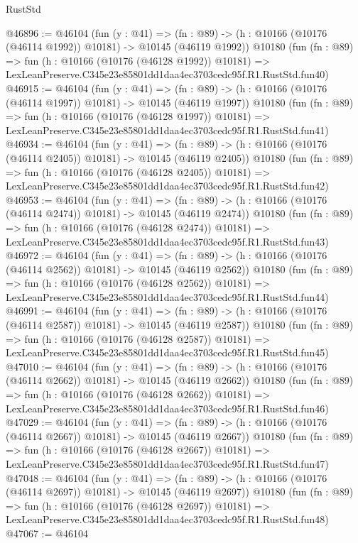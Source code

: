 \begin{lexlean}{RustStd}
\begin{coremodule}
@46896 := @46104
    (fun (y : @41) =>
    (fn : @89) -> (h : @10166 (@10176 (@46114 @1992)) @10181) -> @10145 (@46119 @1992))
    @10180
    (fun (fn : @89) =>
    fun (h : @10166 (@10176 (@46128 @1992)) @10181) =>
    LexLeanPreserve.C345e23e85801dd1daa4ec3703cedc95f.R1.RustStd.fun40)
@46915 := @46104
    (fun (y : @41) =>
    (fn : @89) -> (h : @10166 (@10176 (@46114 @1997)) @10181) -> @10145 (@46119 @1997))
    @10180
    (fun (fn : @89) =>
    fun (h : @10166 (@10176 (@46128 @1997)) @10181) =>
    LexLeanPreserve.C345e23e85801dd1daa4ec3703cedc95f.R1.RustStd.fun41)
@46934 := @46104
    (fun (y : @41) =>
    (fn : @89) -> (h : @10166 (@10176 (@46114 @2405)) @10181) -> @10145 (@46119 @2405))
    @10180
    (fun (fn : @89) =>
    fun (h : @10166 (@10176 (@46128 @2405)) @10181) =>
    LexLeanPreserve.C345e23e85801dd1daa4ec3703cedc95f.R1.RustStd.fun42)
@46953 := @46104
    (fun (y : @41) =>
    (fn : @89) -> (h : @10166 (@10176 (@46114 @2474)) @10181) -> @10145 (@46119 @2474))
    @10180
    (fun (fn : @89) =>
    fun (h : @10166 (@10176 (@46128 @2474)) @10181) =>
    LexLeanPreserve.C345e23e85801dd1daa4ec3703cedc95f.R1.RustStd.fun43)
@46972 := @46104
    (fun (y : @41) =>
    (fn : @89) -> (h : @10166 (@10176 (@46114 @2562)) @10181) -> @10145 (@46119 @2562))
    @10180
    (fun (fn : @89) =>
    fun (h : @10166 (@10176 (@46128 @2562)) @10181) =>
    LexLeanPreserve.C345e23e85801dd1daa4ec3703cedc95f.R1.RustStd.fun44)
@46991 := @46104
    (fun (y : @41) =>
    (fn : @89) -> (h : @10166 (@10176 (@46114 @2587)) @10181) -> @10145 (@46119 @2587))
    @10180
    (fun (fn : @89) =>
    fun (h : @10166 (@10176 (@46128 @2587)) @10181) =>
    LexLeanPreserve.C345e23e85801dd1daa4ec3703cedc95f.R1.RustStd.fun45)
@47010 := @46104
    (fun (y : @41) =>
    (fn : @89) -> (h : @10166 (@10176 (@46114 @2662)) @10181) -> @10145 (@46119 @2662))
    @10180
    (fun (fn : @89) =>
    fun (h : @10166 (@10176 (@46128 @2662)) @10181) =>
    LexLeanPreserve.C345e23e85801dd1daa4ec3703cedc95f.R1.RustStd.fun46)
@47029 := @46104
    (fun (y : @41) =>
    (fn : @89) -> (h : @10166 (@10176 (@46114 @2667)) @10181) -> @10145 (@46119 @2667))
    @10180
    (fun (fn : @89) =>
    fun (h : @10166 (@10176 (@46128 @2667)) @10181) =>
    LexLeanPreserve.C345e23e85801dd1daa4ec3703cedc95f.R1.RustStd.fun47)
@47048 := @46104
    (fun (y : @41) =>
    (fn : @89) -> (h : @10166 (@10176 (@46114 @2697)) @10181) -> @10145 (@46119 @2697))
    @10180
    (fun (fn : @89) =>
    fun (h : @10166 (@10176 (@46128 @2697)) @10181) =>
    LexLeanPreserve.C345e23e85801dd1daa4ec3703cedc95f.R1.RustStd.fun48)
@47067 := @46104

\end{coremodule}
\end{lexlean}
